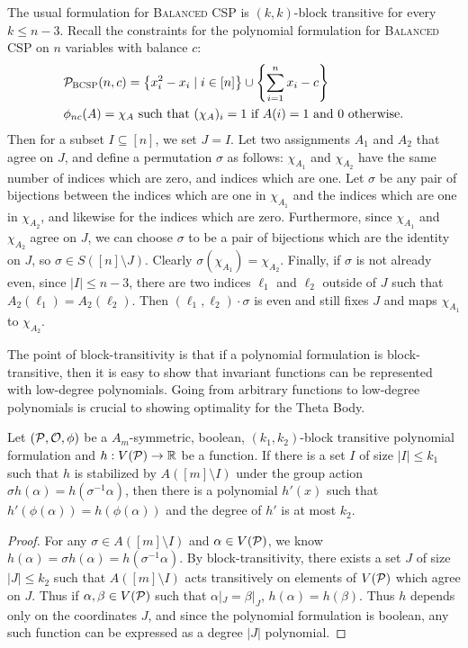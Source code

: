 \begin{example}\label{ex:bcsp-blocktransitive}
The usual formulation for \textsc{Balanced CSP} is $(k,k)$-block transitive for every $k \leq n-3$. Recall the constraints for the polynomial formulation for \textsc{Balanced CSP} on $n$ variables with balance $c$:
\begin{align*}
&\mathcal P_{\textsc{BCSP}}(n,c) = \left\{x_i^2 - x_i \mid i \in [n]\right\} \cup \left\{\sum_{i=1}^n x_i - c\right\} \\
&\phi_{nc}(A) = \chi_A \text{ such that } (\chi_A)_i = 1 \text{ if $A(i) = 1$ and $0$ otherwise.}
\end{align*}
Then for a subset $I \subseteq [n]$, we set $J = I$. Let two assignments $A_1$ and $A_2$ that agree on $J$, and define a permutation $\sigma$ as follows: $\chi_{A_1}$ and $\chi_{A_2}$ have the same number of indices which are zero, and indices which are one. Let $\sigma$ be any pair of bijections between the indices which are one in $\chi_{A_1}$ and the indices which are one in $\chi_{A_2}$, and likewise for the indices which are zero. Furthermore, since $\chi_{A_1}$ and $\chi_{A_2}$ agree on $J$, we can choose $\sigma$ to be a pair of bijections which are the identity on $J$, so $\sigma \in S([n] \setminus J)$. Clearly $\sigma(\chi_{A_1}) = \chi_{A_2}$. Finally, if $\sigma$ is not already even, since $|I| \leq n-3$, there are two indices $\ell_1$ and $\ell_2$ outside of $J$ such that $A_2(\ell_1) = A_2(\ell_2)$. Then $(\ell_1, \ell_2) \cdot \sigma$ is even and still fixes $J$ and maps $\chi_{A_1}$ to $\chi_{A_2}$.
\end{example}

The point of block-transitivity is that if a polynomial formulation is block-transitive, then it is easy to show that invariant functions can be represented with low-degree polynomials. Going from arbitrary functions to low-degree polynomials is crucial to showing optimality for the Theta Body.  
\begin{lemma}\label{lem:functopoly}
Let $(\mathcal P, \mathcal O, \phi)$ be a $A_m$-symmetric, boolean, $(k_1,k_2)$-block transitive polynomial formulation and $h: V(\mathcal P) \rightarrow \mathbb R$ be a function. If there is a set $I$ of size $|I| \leq k_1$ such that $h$ is stabilized by $A([m] \setminus I)$ under the group action $\sigma h(\alpha) = h(\sigma^{-1} \alpha)$, then there is a polynomial $h'(x)$ such that $h'(\phi(\alpha)) = h(\phi(\alpha))$ and the degree of $h'$ is at most $k_2$. 
\end{lemma}
\begin{proof}
For any $\sigma \in A([m] \setminus I)$ and $\alpha \in V(\mathcal P)$, we know $h(\alpha) = \sigma h(\alpha) = h(\sigma^{-1} \alpha)$. By block-transitivity, there exists a set $J$ of size $|J| \leq k_2$ such that $A([m]\setminus I)$ acts transitively on elements of $V(\mathcal P)$ which agree on $J$. Thus if $\alpha,\beta \in V(\mathcal P)$ such that $\alpha|_J = \beta|_J$, $h(\alpha) = h(\beta)$. Thus $h$ depends only on the coordinates $J$, and since the polynomial formulation is boolean, any such function can be expressed as a degree $|J|$ polynomial. 
\end{proof} 

